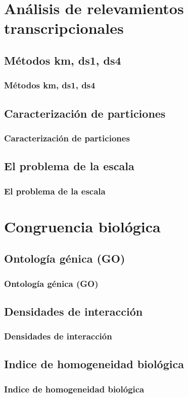 \documentclass[serif,9pt, t]{beamer}
\begin{document}
\section{Análisis de relevamientos transcripcionales}

\subsection{Métodos km, ds1, ds4}
\begin{frame}
\frametitle{Métodos km, ds1, ds4} 
\end{frame}

\subsection{Caracterización de particiones}
\begin{frame}
\frametitle{Caracterización de particiones} 
\end{frame}

\subsection{El problema de la escala}
\begin{frame}
\frametitle{El problema de la escala} 
\end{frame}

\section{Congruencia biológica}

\subsection{Ontología génica (GO)}
\begin{frame}
\frametitle{Ontología génica (GO)} 
\end{frame}

\subsection{Densidades de interacción}
\begin{frame}
\frametitle{Densidades de interacción} 
\end{frame}

\subsection{Indice de homogeneidad biológica}
\begin{frame}
\frametitle{Indice de homogeneidad biológica} 
\end{frame}
\end{document}
